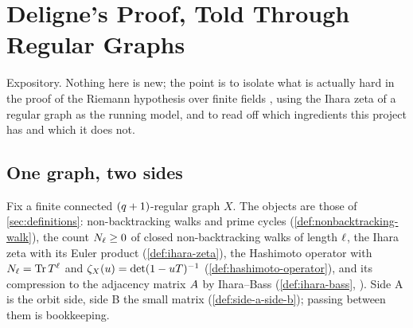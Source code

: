 
\section{Deligne's Proof, Told Through Regular Graphs}
\label{sec:deligne}

Expository. Nothing here is new; the point is to isolate what is actually hard in the proof of the Riemann
hypothesis over finite fields \cite{deligne1974weil}, using the Ihara zeta \cite{ihara1966discrete} of a
regular graph as the running model, and to read off which ingredients this project has and which it does
not.

\subsection{One graph, two sides}

Fix a finite connected $(q+1)$-regular graph $X$. The objects are those of \cref{sec:definitions}:
non-backtracking walks and prime cycles (\cref{def:nonbacktracking-walk}), the count $N_{\ell}\ge0$ of
closed non-backtracking walks of length $\ell$, the Ihara zeta with its Euler product
(\cref{def:ihara-zeta}), the Hashimoto operator with $N_{\ell} = \operatorname{Tr}T^{\ell}$ and $\zeta_{X}(u) =
\det(1-uT)^{-1}$ (\cref{def:hashimoto-operator}), and its compression to the adjacency matrix $A$
by Ihara--Bass (\cref{def:ihara-bass}, \cite{bass1992ihara}). Side A is the orbit side, side B the small
matrix (\cref{def:side-a-side-b}); passing between them is bookkeeping.

